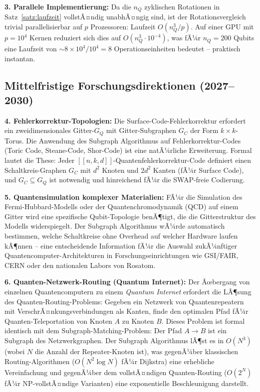 ﻿\documentclass[a4paper,12pt]{article}
\theoremstyle{definition}
\begin{document}
\textbf{3. Parallele Implementierung:}
Da die $n_Q$ zyklischen Rotationen in Satz~\ref{satz:laufzeit} vollstÃ¤ndig
unabhÃ¤ngig sind, ist der Rotationsvergleich trivial parallelisierbar auf $p$
Prozessoren: Laufzeit $O(n_Q^3/p)$. Auf einer GPU mit $p = 10^4$ Kernen
reduziert sich dies auf $O(n_Q^3 \cdot 10^{-4})$, was fÃ¼r $n_Q = 200$ Qubits
eine Laufzeit von $\sim 8 \times 10^4 / 10^4 = 8$ Operationseinheiten bedeutet
-- praktisch instantan.

\subsection{Mittelfristige Forschungsdirektionen (2027--2030)}

\textbf{4. Fehlerkorrektur-Topologien:}
Die Surface-Code-Fehlerkorrektur erfordert ein zweidimensionales Gitter-$G_Q$
mit Gitter-Subgraphen $G_C$ der Form $k \times k$-Torus. Die Anwendung des
Subgraph Algorithmus auf Fehlerkorrektur-Codes (Toric Code, Steane-Code,
Shor-Code) ist eine natÃ¼rliche Erweiterung. Formal lautet die These: Jeder
$[[n, k, d]]$-Quantenfehlerkorrektur-Code definiert einen Schaltkreis-Graphen
$G_C$ mit $d^2$ Knoten und $2d^2$ Kanten (fÃ¼r Surface Code), und
$G_C \subseteq G_Q$ ist notwendig und hinreichend fÃ¼r die SWAP-freie Codierung.

\textbf{5. Quantensimulation komplexer Materialien:}
FÃ¼r die Simulation des Fermi-Hubbard-Modells oder der Quantenchromodynamik
(QCD) auf einem Gitter wird eine spezifische Qubit-Topologie benÃ¶tigt, die
die Gitterstruktur des Modells widerspiegelt. Der Subgraph Algorithmus wÃ¼rde
automatisch bestimmen, welche Schaltkreise ohne Overhead auf welcher Hardware
laufen kÃ¶nnen -- eine entscheidende Information fÃ¼r die Auswahl zukÃ¼nftiger
Quantencomputer-Architekturen in Forschungseinrichtungen wie GSI/FAIR,
CERN oder den nationalen Labors von Rosatom.

\textbf{6. Quanten-Netzwerk-Routing (Quantum Internet):}
Der Ãœbergang von einzelnen Quantencomputern zu einem \emph{Quantum Internet}
erfordert die LÃ¶sung des Quanten-Routing-Problems: Gegeben ein Netzwerk von
Quantenrepeatern mit VerschrÃ¤nkungsverbindungen als Kanten, finde den optimalen
Pfad fÃ¼r Quanten-Teleportation von Knoten $A$ zu Knoten $B$. Dieses Problem ist
formal identisch mit dem Subgraph-Matching-Problem: Der Pfad $A \to B$ ist ein
Subgraph des Netzwerkgraphen. Der Subgraph Algorithmus lÃ¶st es in $O(N^3)$
(wobei $N$ die Anzahl der Repeater-Knoten ist), was gegenÃ¼ber klassischen
Routing-Algorithmen ($O(N^2 \log N)$ fÃ¼r Dijkstra) eine erhebliche Vereinfachung
und gegenÃ¼ber dem vollstÃ¤ndigen Quanten-Routing ($O(2^N)$ fÃ¼r NP-vollstÃ¤ndige
Varianten) eine exponentielle Beschleunigung darstellt.
\end{document}
